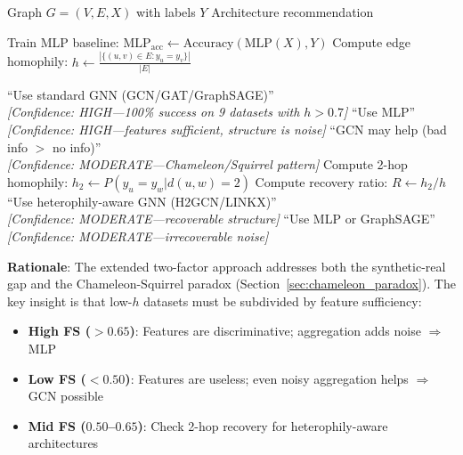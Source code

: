 \begin{algorithm}[t]
\caption{Extended Two-Factor Architecture Selection}
\label{alg:spi_decision}
\begin{algorithmic}[1]
\REQUIRE Graph $G = (V, E, X)$ with labels $Y$
\ENSURE Architecture recommendation

\STATE Train MLP baseline: $\text{MLP}_{\text{acc}} \leftarrow \text{Accuracy}(\text{MLP}(X), Y)$
\STATE Compute edge homophily: $h \leftarrow \frac{|\{(u,v) \in E : y_u = y_v\}|}{|E|}$

    \RETURN ``Use standard GNN (GCN/GAT/GraphSAGE)'' \\
    \hspace{1em} \textit{[Confidence: HIGH---100\% success on 9 datasets with $h > 0.7$]}
\ELSE
        \RETURN ``Use MLP'' \\
        \hspace{1em} \textit{[Confidence: HIGH---features sufficient, structure is noise]}
        \RETURN ``GCN may help (bad info $>$ no info)'' \\
        \hspace{1em} \textit{[Confidence: MODERATE---Chameleon/Squirrel pattern]}
    \ELSE
        \STATE Compute 2-hop homophily: $h_2 \leftarrow P(y_u = y_w | d(u,w) = 2)$
        \STATE Compute recovery ratio: $R \leftarrow h_2 / h$
            \RETURN ``Use heterophily-aware GNN (H2GCN/LINKX)'' \\
            \hspace{1em} \textit{[Confidence: MODERATE---recoverable structure]}
        \ELSE
            \RETURN ``Use MLP or GraphSAGE'' \\
            \hspace{1em} \textit{[Confidence: MODERATE---irrecoverable noise]}
        \ENDIF
    \ENDIF
\ENDIF
\end{algorithmic}
\end{algorithm}

\textbf{Rationale}: The extended two-factor approach addresses both the synthetic-real gap and the Chameleon-Squirrel paradox (Section~\ref{sec:chameleon_paradox}). The key insight is that low-$h$ datasets must be subdivided by feature sufficiency:
\begin{itemize}
    \item \textbf{High FS ($> 0.65$)}: Features are discriminative; aggregation adds noise $\Rightarrow$ MLP
    \item \textbf{Low FS ($< 0.50$)}: Features are useless; even noisy aggregation helps $\Rightarrow$ GCN possible
    \item \textbf{Mid FS ($0.50$--$0.65$)}: Check 2-hop recovery for heterophily-aware architectures
\end{itemize}

